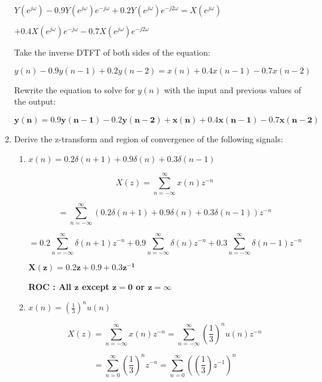 \documentclass[fleqn]{article}
\begin{document}
\begin{enumerate}[nolistsep]
			$Y(e^{j\omega}) - 0.9Y(e^{j\omega})e^{-j\omega} + 0.2Y(e^{j\omega})e^{-j2\omega} = X(e^{j\omega})$
			
			$ + 0.4X(e^{j\omega})e^{-j\omega} - 0.7X(e^{j\omega})e^{-j2\omega}$
			
			Take the inverse DTFT of both sides of the equation:
			
			$y(n) - 0.9y(n-1) + 0.2y(n-2) = x(n) + 0.4x(n-1) - 0.7x(n-2)$
			
			Rewrite the equation to solve for $y(n)$ with the input and previous values of the output:
			
			$\mathbf{y(n) = 0.9y(n-1) - 0.2y(n-2) + x(n) + 0.4x(n-1) - 0.7x(n-2)}$
			
		\item Derive the z-transform and region of convergence of the following signals:
		
			\begin{enumerate}[nolistsep]
				\item $x(n) = 0.2\delta(n+1) + 0.9\delta(n) + 0.3\delta(n-1)$
				
					\pagebreak
					\begin{equation*}
						X(z) = \sum_{n=-\infty}^{\infty}x(n)z^{-n}
					\end{equation*}
					
					\begin{equation*}
						= \sum_{n=-\infty}^{\infty}(0.2\delta(n+1) + 0.9\delta(n) + 0.3\delta(n-1))z^{-n}
					\end{equation*}
					
					\begin{equation*}
						= 0.2\sum_{n=-\infty}^{\infty}\delta(n+1)z^{-n} + 0.9\sum_{n=-\infty}^{\infty}\delta(n)z^{-n} + 0.3\sum_{n=-\infty}^{\infty}\delta(n-1)z^{-n}
					\end{equation*}
					
					$\mathbf{X(z) = 0.2z + 0.9 + 0.3z^{-1}}$
					
					\textbf{ROC : All $\mathbf{z}$ except $\mathbf{z = 0}$ or $\mathbf{z = \infty}$}
					
				\item $x(n) = \left(\frac{1}{3}\right)^{n}u(n)$
				
					\begin{equation*}
						X(z) = \sum_{n=-\infty}^{\infty}x(n)z^{-n} = \sum_{n=-\infty}^{\infty}\left(\frac{1}{3}\right)^{n}u(n)z^{-n}
					\end{equation*}
					
					\begin{equation*}
						= \sum_{n=0}^{\infty}\left(\frac{1}{3}\right)^{n}z^{-n} = \sum_{n=0}^{\infty}\left(\left(\frac{1}{3}\right)z^{-1}\right)^{n}
					\end{equation*}
					

\end{enumerate}
\end{enumerate}
\end{document}
